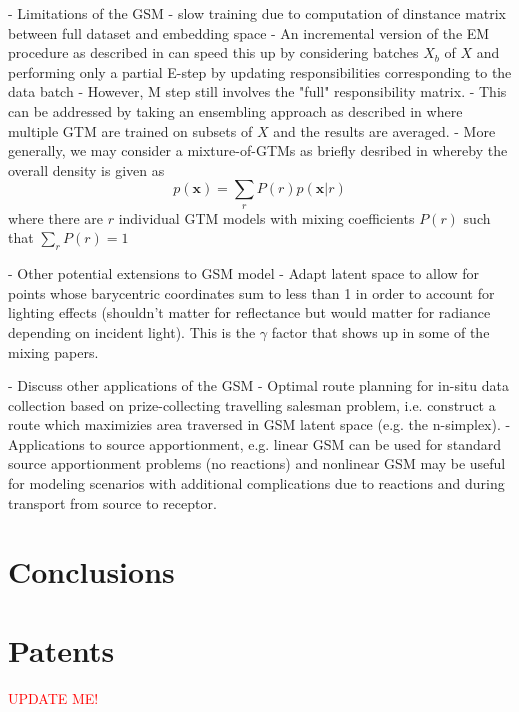 \documentclass[remotesensing,article,submit,pdftex,moreauthors]{Definitions/mdpi}
\begin{document}
- Limitations of the GSM
    - slow training due to computation of dinstance matrix between full dataset and embedding space
    - An incremental version of the EM procedure as described in \cite{gtm-developments} can speed this up by considering batches $X_b$ of $X$ and performing only a partial E-step by updating responsibilities corresponding to the data batch
    - However, M step still involves the "full" responsibility matrix. 
    - This can be addressed by taking an ensembling approach as described in \cite{parallel-gtm} where multiple GTM are trained on subsets of $X$ and the results are averaged. 
    - More generally, we may consider a mixture-of-GTMs as briefly desribed in \cite{gtm-orig} whereby the overall density is given as 
    \begin{equation}
        p(\mathbf{x}) = \sum_r P(r)p(\mathbf{x}\vert r)
    \end{equation}
    where there are $r$ individual GTM models with mixing coefficients $P(r)$ such that $\sum_r P(r) =1$

- Other potential extensions to GSM model
     - Adapt latent space  to allow for points whose barycentric coordinates sum to less than 1 in order to account for lighting effects (shouldn't matter for reflectance but would matter for radiance depending on incident light). This is the $\gamma$ factor that shows up in some of the mixing papers.

- Discuss other applications of the GSM
    - Optimal route planning for in-situ data collection based on prize-collecting travelling salesman problem, i.e. construct a route which maximizies area traversed in GSM latent space (e.g. the n-simplex). 
    - Applications to source apportionment, e.g. linear GSM can be used for standard source apportionment problems (no reactions) and nonlinear GSM may be useful for modeling scenarios with additional complications due to reactions and during transport from source to receptor.

\section{Conclusions}


\section{Patents}

\textcolor{red}{UPDATE ME!}

\vspace{6pt} 
\end{document}
